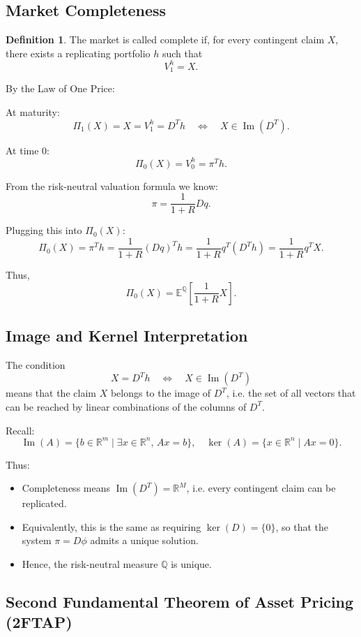 \documentclass[12pt,a4paper]{article}
\theoremstyle{definition}
\newtheorem{definition}{Definition}[section]
\newcommand{\R}{\mathbb{R}}
\newcommand{\Q}{\mathbb{Q}}
\newcommand{\E}{\mathbb{E}}
\begin{document}
\subsection{Market Completeness}

\begin{definition}
The market is called complete if, for every contingent claim $X$, there exists a replicating portfolio $h$ such that
\[
V_1^h = X.
\]
\end{definition}

By the Law of One Price:

At maturity:
\[
\Pi_1(X) = X = V_1^h = D^T h \quad \Leftrightarrow \quad X \in \operatorname{Im}(D^T).
\]

At time 0:
\[
\Pi_0(X) = V_0^h = \pi^T h.
\]

From the risk-neutral valuation formula we know:
\[
\pi = \frac{1}{1+R} Dq.
\]

Plugging this into $\Pi_0(X)$:
\[
\Pi_0(X) = \pi^T h = \frac{1}{1+R}(Dq)^T h = \frac{1}{1+R}q^T(D^T h) = \frac{1}{1+R}q^T X.
\]

Thus,
\[
\Pi_0(X) = \E^\Q\left[\frac{1}{1+R}X\right].
\]

\subsection{Image and Kernel Interpretation}

The condition
\[
X = D^T h \quad \Leftrightarrow \quad X \in \operatorname{Im}(D^T)
\]
means that the claim $X$ belongs to the image of $D^T$, i.e. the set of all vectors that can be reached by linear combinations of the columns of $D^T$.

Recall:
\[
\operatorname{Im}(A) = \{b \in \R^m \mid \exists x \in \R^n, \, Ax = b\}, \quad \ker(A) = \{x \in \R^n \mid Ax = 0\}.
\]

Thus:
\begin{itemize}
\item Completeness means $\operatorname{Im}(D^T) = \R^M$, i.e. every contingent claim can be replicated.
\item Equivalently, this is the same as requiring $\ker(D) = \{0\}$, so that the system $\pi = D\phi$ admits a unique solution.
\item Hence, the risk-neutral measure $\Q$ is unique.
\end{itemize}

\subsection{Second Fundamental Theorem of Asset Pricing (2FTAP)}
\end{document}
